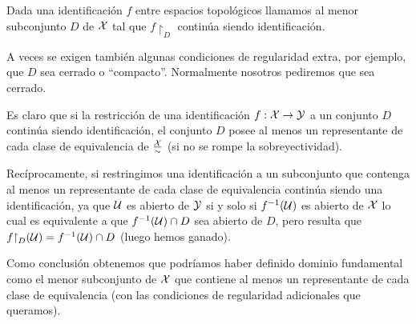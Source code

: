 \begin{defi}
	Dada una identificación $f$ entre espacios topológicos llamamos  al menor subconjunto $D$ de $\mathcal{X}$ tal que $f\restriction_{D}$ continúa siendo identificación.
	
	A veces se exigen también algunas condiciones de regularidad extra, por ejemplo, que $D$ sea cerrado o ``compacto''. Normalmente nosotros pediremos que sea cerrado.
\end{defi}
\begin{obs}
	Es claro que si la restricción de una identificación $f:\mathcal{X}\to\mathcal{Y}$ a un conjunto $D$ continúa siendo identificación, el conjunto $D$ posee al menos un representante de cada clase de equivalencia de $\frac{\mathcal{X}}{\sim}$ (si no se rompe la sobreyectividad).
	
	Recíprocamente, si restringimos una identificación a un subconjunto que contenga al menos un representante de cada clase de equivalencia continúa siendo una identificación, ya que $\mathcal{U}$ es abierto de $\mathcal{Y}$ si y solo si $f^{-1}(\mathcal{U})$ es abierto de $\mathcal{X}$ lo cual es equivalente a que $f^{-1}(\mathcal{U})\cap D$ sea abierto de $D$, pero resulta que $f\mathord{\upharpoonright}_{D}(\mathcal{U})=f^{-1}(\mathcal{U})\cap D$ (luego hemos ganado).
	
	Como conclusión obtenemos que podríamos haber definido dominio fundamental como el menor subconjunto de $\mathcal{X}$ que contiene al menos un representante de cada clase de equivalencia (con las condiciones de regularidad adicionales que queramos).
\end{obs}
